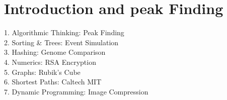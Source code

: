 
\section{Introduction and peak Finding}
1. Algorithmic Thinking: Peak Finding\\
2. Sorting \& Trees: Event Simulation\\
3. Hashing: Genome Comparison\\
4. Numerics: RSA Encryption\\
5. Graphs: Rubik’s Cube\\
6. Shortest Paths: Caltech \textrightarrow MIT\\
7. Dynamic Programming: Image Compression\\